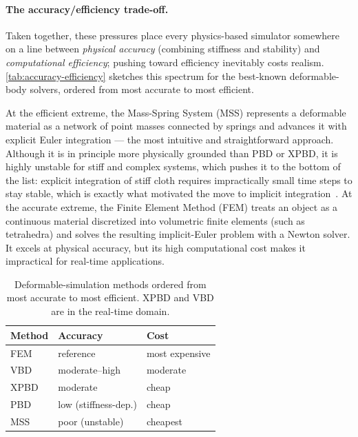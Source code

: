 \paragraph{The accuracy/efficiency trade-off.}
Taken together, these pressures place every physics-based simulator somewhere on
a line between \emph{physical accuracy} (combining stiffness and stability) and
\emph{computational efficiency}; pushing toward efficiency inevitably costs
realism. \autoref{tab:accuracy-efficiency} sketches this spectrum for the
best-known deformable-body solvers, ordered from most accurate to most efficient.

At the efficient extreme, the Mass-Spring System (MSS) represents a deformable
material as a network of point masses connected by springs and advances it with
explicit Euler integration --- the most intuitive and straightforward approach.
Although it is in principle more physically grounded than PBD or XPBD, it is
highly unstable for stiff and complex systems, which pushes it to the bottom of
the list: explicit integration of stiff cloth requires impractically small time
steps to stay stable, which is exactly what motivated the move to implicit
integration~\cite{10.1145/280814.280821}. At the accurate extreme,
the Finite Element Method (FEM) treats an object as a continuous material
discretized into volumetric finite elements (such as tetrahedra) and solves the
resulting implicit-Euler problem with a Newton solver. It excels at physical
accuracy, but its high computational cost makes it impractical for real-time
applications.~\cite{nikishkov2004introfem}

\begin{table}[h]
\centering
\begin{tabular}{l l l}
\toprule
\textbf{Method} & \textbf{Accuracy} & \textbf{Cost} \\
\midrule
FEM     & reference            & most expensive \\
VBD     & moderate--high       & moderate       \\
XPBD    & moderate             & cheap          \\
PBD     & low (stiffness-dep.) & cheap          \\
MSS     & poor (unstable)      & cheapest       \\
\bottomrule
\end{tabular}
\caption{Deformable-simulation methods ordered from most accurate to most
efficient. XPBD and VBD are in the real-time domain.}
\label{tab:accuracy-efficiency}
\end{table}

